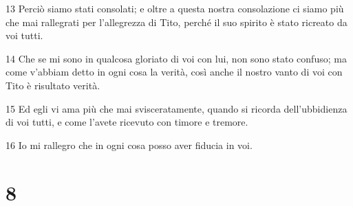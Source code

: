\par 13 Perciò siamo stati consolati; e oltre a questa nostra consolazione ci siamo più che mai rallegrati per l'allegrezza di Tito, perché il suo spirito è stato ricreato da voi tutti.
\par 14 Che se mi sono in qualcosa gloriato di voi con lui, non sono stato confuso; ma come v'abbiam detto in ogni cosa la verità, così anche il nostro vanto di voi con Tito è risultato verità.
\par 15 Ed egli vi ama più che mai svisceratamente, quando si ricorda dell'ubbidienza di voi tutti, e come l'avete ricevuto con timore e tremore.
\par 16 Io mi rallegro che in ogni cosa posso aver fiducia in voi.

\chapter{8}

